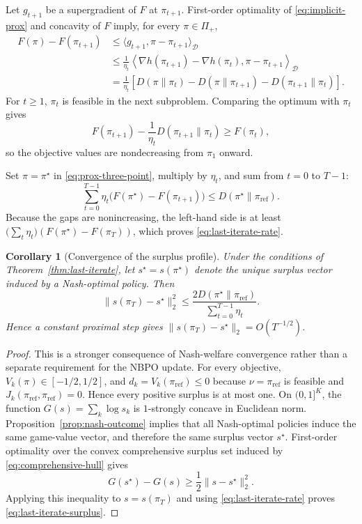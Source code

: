 \documentclass{article}
\newtheorem{corollary}{Corollary}
\theoremstyle{remark}
\theoremstyle{plain}
\newcommand{\D}{\mathcal{D}}
\newcommand{\piref}{\pi_{\mathrm{ref}}}
\begin{document}
Let $g_{t+1}$ be a supergradient of $F$ at $\pi_{t+1}$. First-order optimality of \eqref{eq:implicit-prox} and concavity of $F$ imply, for every $\pi\in\Pi_+$,
\begin{align}
F(\pi)-F(\pi_{t+1})
&\le \langle g_{t+1},\pi-\pi_{t+1}\rangle_\D\\
&\le\frac1{\eta_t}
\left\langle\nabla h(\pi_{t+1})-\nabla h(\pi_t),
\pi-\pi_{t+1}\right\rangle_\D\\
&=\frac1{\eta_t}
\left[
D(\pi\|\pi_t)-D(\pi\|\pi_{t+1})-D(\pi_{t+1}\|\pi_t)
\right].
\label{eq:prox-three-point}
\end{align}
For $t\ge1$, $\pi_t$ is feasible in the next subproblem. Comparing the optimum with $\pi_t$ gives
\begin{equation}
F(\pi_{t+1})-\frac{1}{\eta_t}D(\pi_{t+1}\|\pi_t)
\ge F(\pi_t),
\label{eq:prox-monotone}
\end{equation}
so the objective values are nondecreasing from $\pi_1$ onward.

Set $\pi=\pi^\star$ in \eqref{eq:prox-three-point}, multiply by $\eta_t$, and sum from $t=0$ to $T-1$:
\begin{equation}
\sum_{t=0}^{T-1}\eta_t
\big(F(\pi^\star)-F(\pi_{t+1})\big)
\le
D(\pi^\star\|\piref).
\label{eq:prox-telescope}
\end{equation}
Because the gaps are nonincreasing, the left-hand side is at least
$\big(\sum_t\eta_t\big)(F(\pi^\star)-F(\pi_T))$, which proves \eqref{eq:last-iterate-rate}.

\begin{corollary}[Convergence of the surplus profile]
\label{cor:surplus-convergence}
Under the conditions of Theorem~\ref{thm:last-iterate}, let
$s^\star=s(\pi^\star)$ denote the unique surplus vector induced by a
Nash-optimal policy. Then
\begin{equation}
\|s(\pi_T)-s^\star\|_2^2
\le
\frac{2D(\pi^\star\|\piref)}
{\sum_{t=0}^{T-1}\eta_t}.
\label{eq:last-iterate-surplus}
\end{equation}
Hence a constant proximal step gives
$\|s(\pi_T)-s^\star\|_2=O(T^{-1/2})$.
\end{corollary}

\begin{proof}
This is a stronger consequence of Nash-welfare convergence rather than a
separate requirement for the NBPO update. For every objective,
$V_k(\pi)\in[-1/2,1/2]$, and
$d_k=V_k(\piref)\le0$ because $\nu=\piref$ is feasible and
$J_k(\piref,\piref)=0$. Hence every positive surplus is at most one. On
$(0,1]^K$, the function
$G(s)=\sum_k\log s_k$ is $1$-strongly concave in Euclidean norm.
Proposition~\ref{prop:nash-outcome} implies that all Nash-optimal policies induce the
same game-value vector, and therefore the same surplus vector $s^\star$.
First-order optimality over the convex comprehensive surplus set induced by
\eqref{eq:comprehensive-hull} gives
\begin{equation}
G(s^\star)-G(s)
\ge
\frac12\|s-s^\star\|_2^2.
\label{eq:surplus-strong-concavity}
\end{equation}
Applying this inequality to $s=s(\pi_T)$ and using
\eqref{eq:last-iterate-rate} proves \eqref{eq:last-iterate-surplus}.
\end{proof}
\end{document}
